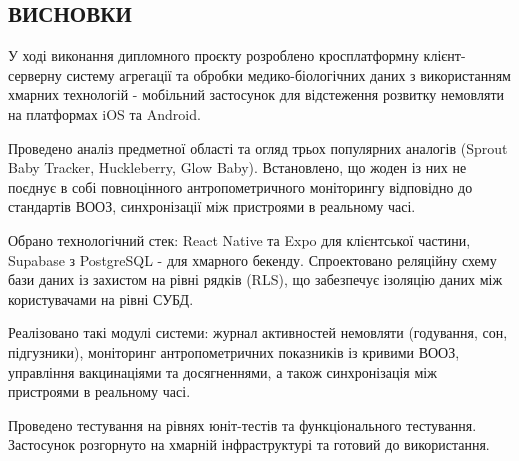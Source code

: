 

\begin{unnumbered}

\section{ВИСНОВКИ}

У ході виконання дипломного проєкту розроблено кросплатформну клієнт-серверну систему агрегації та обробки медико-біологічних даних з використанням хмарних технологій - мобільний застосунок для відстеження розвитку немовляти на платформах iOS та Android.

Проведено аналіз предметної області та огляд трьох популярних аналогів (Sprout Baby Tracker, Huckleberry, Glow Baby). Встановлено, що жоден із них не поєднує в собі повноцінного антропометричного моніторингу відповідно до стандартів \gls{ВООЗ}, синхронізації між пристроями в реальному часі.

Обрано технологічний стек: React Native та Expo для клієнтської частини, Supabase з PostgreSQL - для хмарного бекенду. Спроектовано реляційну схему бази даних із захистом на рівні рядків (\gls{RLS}), що забезпечує ізоляцію даних між користувачами на рівні \gls{СУБД}.

Реалізовано такі модулі системи: журнал активностей немовляти (годування, сон, підгузники), моніторинг антропометричних показників із кривими \gls{ВООЗ}, управління вакцинаціями та досягненнями, а також синхронізація між пристроями в реальному часі.

Проведено тестування на рівнях юніт-тестів та функціонального тестування. Застосунок розгорнуто на хмарній інфраструктурі та готовий до використання.

\end{unnumbered}
